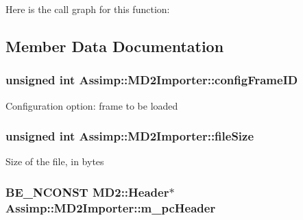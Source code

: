 Here is the call graph for this function\+:




\subsection{Member Data Documentation}
\hypertarget{class_assimp_1_1_m_d2_importer_ad0e582cb925bde6faf43b78841798ba9}{
\subsubsection[{config\+Frame\+I\+D}]{\setlength{\rightskip}{0pt plus 5cm}unsigned int Assimp\+::\+M\+D2\+Importer\+::config\+Frame\+I\+D\hspace{0.3cm}{\ttfamily [protected]}}}\label{class_assimp_1_1_m_d2_importer_ad0e582cb925bde6faf43b78841798ba9}
Configuration option\+: frame to be loaded \hypertarget{class_assimp_1_1_m_d2_importer_a386d2f7303d8065592d8b2a556ec86e7}{
\subsubsection[{file\+Size}]{\setlength{\rightskip}{0pt plus 5cm}unsigned int Assimp\+::\+M\+D2\+Importer\+::file\+Size\hspace{0.3cm}{\ttfamily [protected]}}}\label{class_assimp_1_1_m_d2_importer_a386d2f7303d8065592d8b2a556ec86e7}
Size of the file, in bytes \hypertarget{class_assimp_1_1_m_d2_importer_a6b0641c43c29fa0c43aee7b57808c87c}{
\subsubsection[{m\+\_\+pc\+Header}]{\setlength{\rightskip}{0pt plus 5cm}B\+E\+\_\+\+N\+C\+O\+N\+S\+T {\bf M\+D2\+::\+Header}$\ast$ Assimp\+::\+M\+D2\+Importer\+::m\+\_\+pc\+Header\hspace{0.3cm}{\ttfamily [protected]}}}\label{class_assimp_1_1_m_d2_importer_a6b0641c43c29fa0c43aee7b57808c87c}
